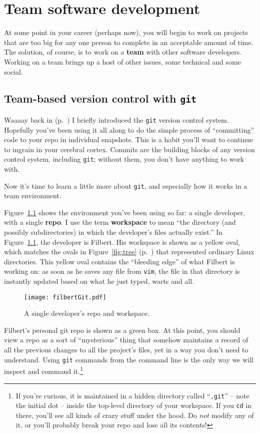 
\chapter{Team software development}

At some point in your career (perhaps now), you will begin to work on projects
that are too big for any one person to complete in an acceptable amount of
time. The solution, of course, is to work on a \textbf{team} with other
software developers. Working on a team brings up a host of other issues, some
technical and some social.

\section{Team-based version control with \texttt{git}}

Waaaay back in  (p.~\pageref{introduceGit}) I briefly
introduced the \texttt{git} version control system. Hopefully you've been
using it all along to do the simple process of ``committing'' code to your
repo in individual snapshots. This is a habit you'll want to continue to
ingrain in your cerebral cortex. Commits are the building blocks of any
version control system, including \texttt{git}; without them, you don't have
anything to work with.

Now it's time to learn a little more about \texttt{git}, and especially how it
works in a team environment.

Figure~\ref{fig:filbertGit} shows the environment you've been using so far: a
single developer, with a single \textbf{repo}. I use the term
\textbf{workspace} to mean ``the directory (and possibly subdirectories) in
which the developer's files actually exist.'' In Figure~\ref{fig:filbertGit},
the developer is Filbert. His workspace is shown as a yellow oval, which
matches the ovals in Figure~\ref{fig:tree} (p.~\pageref{fig:tree}) that
represented ordinary Linux directories. This yellow oval contains the
``bleeding edge'' of what Filbert is working on: as soon as he saves any file
from \texttt{vim}, the file in that directory is instantly updated based on
what he just typed, warts and all.

\begin{figure}[ht]
\centering
\texttt{[image: filbertGit.pdf]}
\caption{A single developer's repo and workspace.}
\label{fig:filbertGit}
\end{figure}

Filbert's personal git repo is shown as a green box. At this point, you should
view a repo as a sort of ``mysterious'' thing that somehow maintains a record
of all the previous changes to all the project's files, yet in a way you don't
need to understand. Using \texttt{git} commands from the command line is the
only way we will inspect and command it.\footnote{If you're curious, it is
maintained in a hidden directory called ``\texttt{.git}'' -- note the initial
dot -- inside the top-level directory of your workspace. If you \texttt{cd} in
there, you'll see all kinds of crazy stuff under the hood. Do \textit{not}
modify any of it, or you'll probably break your repo and lose all its contents!}

